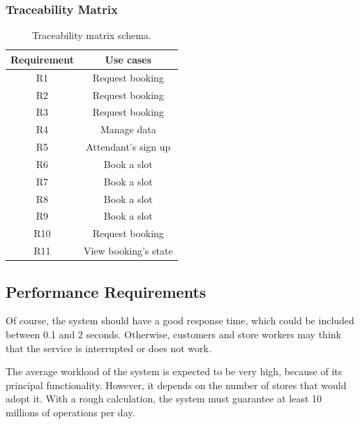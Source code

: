 \documentclass[table, 12pt]{article}
\begin{document}
\begin{flushleft}
    \subsubsection{Traceability Matrix}
    \begin{table}[H]
        \begin{center}
            \begin{tabular}{|c| c|}
                \hline
                \textbf{Requirement} & \textbf{Use cases}   \\
                \hline
                R1                   & Request booking      \\
                R2                   & Request booking      \\
                R3                   & Request booking      \\
                R4                   & Manage data          \\
                R5                   & Attendant's sign up  \\
                R6                   & Book a slot          \\
                R7                   & Book a slot          \\
                R8                   & Book a slot          \\
                R9                   & Book a slot          \\
                R10                  & Request booking      \\
                R11                  & View booking's state \\
                \hline
            \end{tabular}
            \caption{Traceability matrix schema.}
        \end{center}
    \end{table}



    \subsection{Performance Requirements}
    Of course, the system should have a good response time, which could be included between 0.1 and 2 seconds.
    Otherwise, customers and store workers may think that the service is interrupted or does not work.

    The average workload of the system is expected to be very high, because of its principal functionality. However, it depends on the number of stores that would adopt it.
    With a rough calculation, the system must guarantee at least 10 millions of operations per day.


\end{flushleft}
\end{document}
